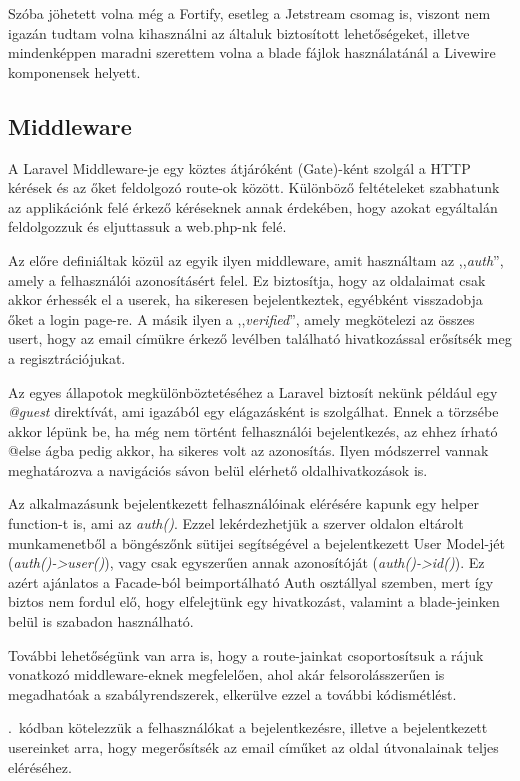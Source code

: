 \documentclass[
]{thesis-ekf}
\theoremstyle{definition}
\theoremstyle{remark}
\begin{document}
                Szóba jöhetett volna még a Fortify, esetleg a Jetstream\cite{Laravel-AuthComparison} csomag is, viszont nem igazán tudtam volna kihasználni az általuk biztosított lehetőségeket, illetve mindenképpen maradni szerettem volna a blade fájlok használatánál a Livewire komponensek helyett.
                
                \subsection{Middleware}
                A Laravel Middleware-je egy köztes átjáróként (Gate)-ként szolgál a HTTP kérések és az őket feldolgozó route-ok között. Különböző feltételeket szabhatunk az applikációnk felé érkező kéréseknek annak érdekében, hogy azokat egyáltalán feldolgozzuk és eljuttassuk a web.php-nk felé.

                Az előre definiáltak közül az egyik ilyen middleware, amit használtam az ,,\emph{auth}'', amely a felhasználói azonosításért felel. Ez biztosítja, hogy az oldalaimat csak akkor érhessék el a userek, ha sikeresen bejelentkeztek, egyébként visszadobja őket a login page-re. A másik ilyen a ,,\emph{verified}'', amely megkötelezi az összes usert, hogy az email címükre érkező levélben található hivatkozással erősítsék meg a regisztrációjukat.
                
                Az egyes állapotok megkülönböztetéséhez a Laravel biztosít nekünk  például egy \emph{@guest} direktívát, ami igazából egy elágazásként is szolgálhat. Ennek a törzsébe akkor lépünk be, ha még nem történt felhasználói bejelentkezés, az ehhez írható @else ágba pedig akkor, ha sikeres volt az azonosítás. Ilyen módszerrel vannak meghatározva a navigációs sávon belül elérhető oldalhivatkozások is.

                Az alkalmazásunk bejelentkezett felhasználóinak elérésére kapunk egy helper function-t is, ami az \emph{auth()}. Ezzel lekérdezhetjük a szerver oldalon eltárolt munkamenetből a böngészőnk sütijei segítségével a bejelentkezett User Model-jét (\emph{auth()->user()}), vagy csak egyszerűen annak azonosítóját (\emph{auth()->id()}). Ez azért ajánlatos a Facade-ból beimportálható Auth osztállyal szemben, mert így biztos nem fordul elő, hogy elfelejtünk egy hivatkozást, valamint a blade-jeinken belül is szabadon használható.

                További lehetőségünk van arra is, hogy a route-jainkat csoportosítsuk a rájuk vonatkozó middleware-eknek megfelelően, ahol akár felsorolásszerűen is megadhatóak a szabályrendszerek, elkerülve ezzel a további kódismétlést.
                
                \Az{\ref{routeCode}}.~kódban kötelezzük a felhasználókat a bejelentkezésre, illetve a bejelentkezett usereinket arra, hogy megerősítsék az email címűket az oldal útvonalainak teljes eléréséhez.
                
\end{document}
